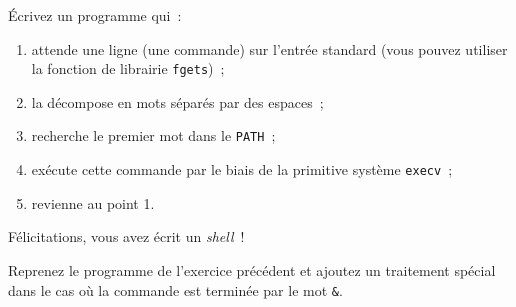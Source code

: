 \question

Écrivez un programme qui~:

\begin {enumerate}
    \item attende une ligne (une commande) sur l'entrée standard (vous
	pouvez utiliser la fonction de librairie {\tt fgets})~;

    \item la décompose en mots séparés par des espaces~;

    \item recherche le premier mot dans le {\tt PATH}~;

    \item exécute cette commande par le biais de la primitive système
	{\tt execv}~;
    
    \item revienne au point 1.

\end {enumerate}

Félicitations, vous avez écrit un {\em shell}~!


\question

Reprenez le programme de l'exercice précédent et ajoutez un traitement
spécial dans le cas où la commande est terminée par le mot \verb:&:.


